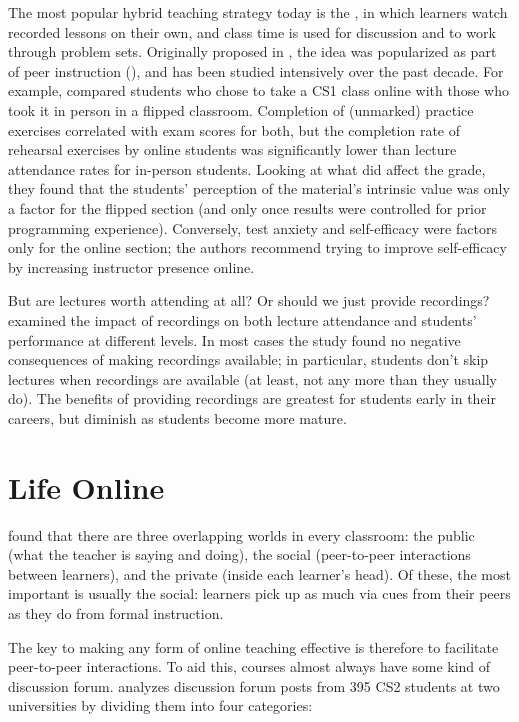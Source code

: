 The most popular hybrid teaching strategy today is the
, in which learners
watch recorded lessons on their own, and class time is used for
discussion and to work through problem sets.  Originally proposed in
\cite{King1993}, the idea was popularized as part of peer instruction
(), and has been studied intensively over the
past decade.  For example, \cite{Camp2016} compared students who chose
to take a CS1 class online with those who took it in person in a
flipped classroom.  Completion of (unmarked) practice exercises
correlated with exam scores for both, but the completion rate of
rehearsal exercises by online students was significantly lower than
lecture attendance rates for in-person students.  Looking at what did
affect the grade, they found that the students' perception of the
material's intrinsic value was only a factor for the flipped section
(and only once results were controlled for prior programming
experience).  Conversely, test anxiety and self-efficacy were factors
only for the online section; the authors recommend trying to improve
self-efficacy by increasing instructor presence online.

But are lectures worth attending at all?  Or should we just provide
recordings?  \cite{Nord2017} examined the impact of recordings on both
lecture attendance and students' performance at different levels.  In
most cases the study found no negative consequences of making
recordings available; in particular, students don't skip lectures when
recordings are available (at least, not any more than they usually
do).  The benefits of providing recordings are greatest for students
early in their careers, but diminish as students become more mature.

\section{Life Online}\label{s:online-engagement}

\cite{Nuth2007} found that there are three overlapping worlds in every
classroom: the public (what the teacher is saying and doing), the
social (peer-to-peer interactions between learners), and the private
(inside each learner's head).  Of these, the most important is usually
the social: learners pick up as much via cues from their peers as they
do from formal instruction.

The key to making any form of online teaching effective is therefore
to facilitate peer-to-peer interactions.  To aid this, courses almost
always have some kind of discussion forum.  \cite{Vell2017} analyzes
discussion forum posts from 395 CS2 students at two universities by
dividing them into four categories:

